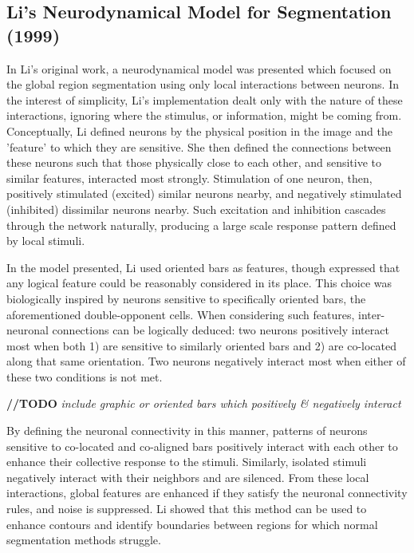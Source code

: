 \documentclass[journal,onecolumn]{IEEEtran}
\begin{document}
\subsection*{Li's Neurodynamical Model for Segmentation (1999)}
In Li's original work, a neurodynamical model was presented which focused on the global region segmentation using only local interactions between neurons. In the interest of simplicity, Li's implementation dealt only with the nature of these interactions, ignoring where the stimulus, or information, might be coming from. Conceptually, Li defined neurons by the physical position in the image and the 'feature' to which they are sensitive. She then defined the connections between these neurons such that those physically close to each other, and sensitive to similar features, interacted most strongly. Stimulation of one neuron, then, positively stimulated (excited) similar neurons nearby, and negatively stimulated (inhibited) dissimilar neurons nearby. Such excitation and inhibition cascades through the network naturally, producing a large scale response pattern defined by local stimuli.

In the model presented, Li used oriented bars as features, though expressed that any logical feature could be reasonably considered in its place. This choice was biologically inspired by neurons sensitive to specifically oriented bars, the aforementioned double-opponent cells. When considering such features, inter-neuronal connections can be logically deduced: two neurons positively interact most when both 1) are sensitive to similarly oriented bars and 2) are co-located along that same orientation. Two neurons negatively interact most when either of these two conditions is not met.

\bigskip

\textbf{//TODO} \textit{include graphic or oriented bars which positively \& negatively interact}

\bigskip

By defining the neuronal connectivity in this manner, patterns of neurons sensitive to co-located and co-aligned bars positively interact with each other to enhance their collective response to the stimuli. Similarly, isolated stimuli negatively interact with their neighbors and are silenced. From these local interactions, global features are enhanced if they satisfy the neuronal connectivity rules, and noise is suppressed. Li showed that this method can be used to enhance contours and identify boundaries between regions for which normal segmentation methods struggle.
\end{document}
